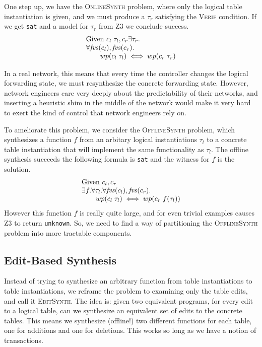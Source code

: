 One step up, we have the \textsc{OnlineSynth} problem, where only the logical
table instantiation is given, and we must produce a $\tau_r$ satisfying the
\textsc{Verif} condition. If we get \texttt{sat} and a model for $\tau_r$ from
Z3 we conclude success.
\[\begin{array}{lcl}
    \text{Given } c_l\; \tau_l,c_r
    \exists \tau_r.\\
    \forall \mathit{fvs}(c_l), \mathit{fvs}(c_r). \\
    \qquad wp(c_l\; \tau_l) \iff wp(c_r\; \tau_r)
  \end{array}
\]

In a real network, this means that every time the
controller changes the logical forwarding state, we must resynthesize the
concrete forwarding state. However, network engineers care very deeply about the
predictability of their networks, and inserting a heuristic shim in the middle
of the network would make it very hard to exert the kind of control that network
engineers rely on.

To ameliorate this problem, we consider the \textsc{OfflineSynth} problem, which
synthesizes a function $f$ from an arbitary logical instantiations $\tau_l$ to a
concrete table instantiation that will implement the same functionality as
$\tau_l$. The offline synthesis succeeds the following formula is \texttt{sat}
and the witness for $f$ is the solution.
\[\begin{array}{l}
    \text{Given } c_l,c_r\\
    \exists f. \forall \tau_l. \forall \mathit{fvs}(c_l), \mathit{fvs}(c_r). \\
    \qquad wp(c_l\; \tau_l) \iff wp(c_r\; f(\tau_l))
  \end{array}\]
However this function $f$ is really quite large, and for even trivial
examples causes Z3 to return \texttt{unknown}. So, we need to find a way of
partitioning the \textsc{OfflineSynth} problem into more tractable
components.

\subsection{Edit-Based Synthesis}

Instead of trying to synthesize an arbitrary function from table instantiations
to table instantiations, we reframe the problem to examining only the table
edits, and call it \textsc{EditSynth}. The idea is: given two equivalent
programs, for every edit to a logical table, can we synthesize an equivalent set
of edits to the concrete tables. This means we synthesize (offline!) two
different functions for each table, one for additions and one for
deletions. This works so long as we have a notion of transactions.

